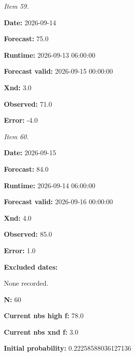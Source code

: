 \documentclass[11pt]{article}
\begin{document}
\par\noindent\textit{Item 59.}\par \par\noindent\textbf{Date:} 2026-09-14

\par\noindent\textbf{Forecast:} 75.0

\par\noindent\textbf{Runtime:} 2026-09-13 06:00:00

\par\noindent\textbf{Forecast valid:} 2026-09-15 00:00:00

\par\noindent\textbf{Xnd:} 3.0

\par\noindent\textbf{Observed:} 71.0

\par\noindent\textbf{Error:} -4.0

\par\noindent\textit{Item 60.}\par \par\noindent\textbf{Date:} 2026-09-15

\par\noindent\textbf{Forecast:} 84.0

\par\noindent\textbf{Runtime:} 2026-09-14 06:00:00

\par\noindent\textbf{Forecast valid:} 2026-09-16 00:00:00

\par\noindent\textbf{Xnd:} 4.0

\par\noindent\textbf{Observed:} 85.0

\par\noindent\textbf{Error:} 1.0

\par\noindent\textbf{Excluded dates:} \par None recorded.

\par\noindent\textbf{N:} 60

\par\noindent\textbf{Current nbs high f:} 78.0

\par\noindent\textbf{Current nbs xnd f:} 3.0

\par\noindent\textbf{Initial probability:} 0.22258588036127136
\end{document}
